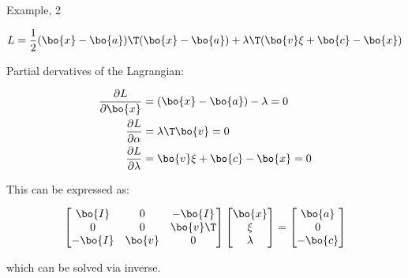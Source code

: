 \documentclass{beamer}
\begin{document}
\begin{frame}{Example, 2}
	\begin{flushleft}
		
		\begin{equation}
			L =  \frac{1}{2}(\bo{x}- \bo{a})\T(\bo{x}- \bo{a}) + \lambda\T ( \bo{v} \xi + \bo{c} - \bo{x})
		\end{equation}
		
		Partial dervatives of the Lagrangian:
		
		\begin{align}
			\frac{\partial L}{\partial \bo{x}} &=  (\bo{x}- \bo{a}) - \lambda = 0
			\\
			\frac{\partial L}{\partial \alpha} &=  \lambda\T \bo{v} = 0
			\\
			\frac{\partial L}{\partial  \lambda} &=   \bo{v} \xi + \bo{c} - \bo{x} = 0
		\end{align}
		
		This can be expressed as:
		
		\begin{align}
				\begin{bmatrix}
					\bo{I} & 0 & -\bo{I} 
					\\
					0 & 0 & \bo{v}\T
					\\
					-\bo{I} & \bo{v} & 0
				\end{bmatrix}
				\begin{bmatrix}
				\bo{x} \\ \xi \\  \lambda
				\end{bmatrix}
				=
				\begin{bmatrix}
					\bo{a} \\ 0 \\  -\bo{c}
				\end{bmatrix}
		\end{align}
		
		which can be solved via inverse.
		
	\end{flushleft}
\end{frame}
\end{document}
